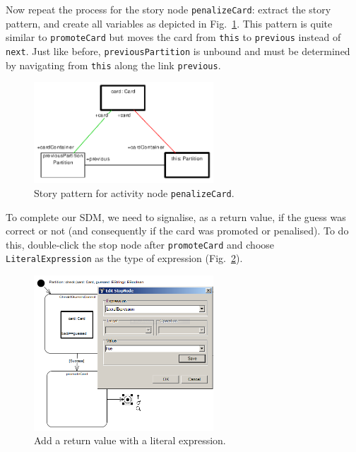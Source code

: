 Now repeat the process for the story node \texttt{penalizeCard}: extract the
story pattern, and create all variables as depicted in
Fig.~\ref{fig:sdm_check_complete_penalize}.  This pattern is quite similar to
\texttt{promoteCard} but moves the card from \texttt{this} to \texttt{previous}
instead of \texttt{next}.  Just like before, \texttt{previousPartition} is
unbound and must be determined by navigating from \texttt{this} along the link
\texttt{previous}.

\begin{figure}[htbp]
\begin{center}
  \includegraphics[width=0.6\textwidth]{pics/sdmBilder/check/sdm38}
  \caption{Story pattern for activity node \texttt{penalizeCard}.}  
  \label{fig:sdm_check_complete_penalize}
\end{center}
\end{figure}

To complete our SDM, we need to signalise, as a return value, if the guess was
correct or not (and consequently if the card was promoted or penalised).  To do
this, double-click the stop node after \texttt{promoteCard} and choose
\texttt{LiteralExpression} as the type of expression
(Fig.~\ref{fig:sdm_check_literal_exp}).  

\begin{figure}[htbp]
\begin{center}
  \includegraphics[width=0.6\textwidth]{pics/sdmBilder/check/sdm39}
  \caption{Add a return value with a literal expression.}  
  \label{fig:sdm_check_literal_exp}
\end{center}
\end{figure}


